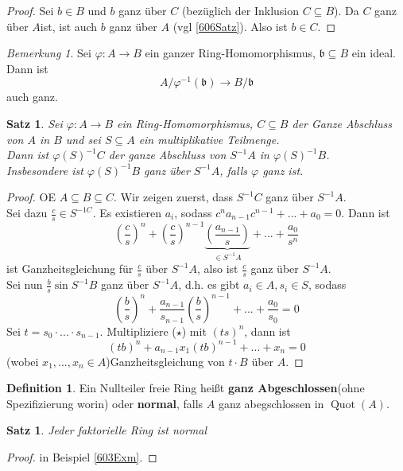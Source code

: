 \documentclass[10pt,a4paper]{article}
\newcommand{\Quot}{\operatorname{Quot}}
\newcounter{thm}[section]
\theoremstyle{definition}
\newtheorem{definition}[thm]{Definition}
\theoremstyle{plain}
\newtheorem{satz}[thm]{Satz}
\theoremstyle{remark}
\newtheorem{bem}[thm]{Bemerkung}
\begin{document}
\begin{proof}
	Sei $b\in B$ und $b$ ganz über $C$ (bezüglich der Inklusion $C\subseteq B$). Da $C$ ganz über $A$ist, ist auch $b$ ganz über $A$ (vgl \ref{606Satz}). Also ist $b\in C$.
\end{proof}

\begin{bem}
	Sei $\varphi:A\rightarrow B$ ein ganzer Ring-Homomorphismus, $\mathfrak b\subseteq B$ ein ideal. Dann ist\[A/\varphi^{-1}(\mathfrak b)\rightarrow B/\mathfrak b\]
	auch ganz.
\end{bem}

\begin{satz}\label{611Satz}
	Sei $\varphi:A\rightarrow B$ ein Ring-Homomorphismus, $C\subseteq B$ der Ganze Abschluss von $A$ in $B$ und sei $S\subseteq A$ ein multiplikative Teilmenge.\\
	Dann ist $\varphi(S)^{-1}C$ der ganze Abschluss von $S^{-1}A$ in $\varphi(S)^{-1}B$.\\
	Insbesondere ist $ \varphi(S)^{-1}B $ ganz über $S^{-1}A$, falls $\varphi$ ganz ist.
\end{satz}
\begin{proof}
	OE $A\subseteq B\subseteq C$. Wir zeigen zuerst, dass $S^{-1}C$ ganz über $S^{-1}A$.\\
	Sei dazu $\frac{c}{s}\in S^{-1 C}$. Es existieren $a_i$, sodass $c^na_{n-1}c^{n-1}+...+a_0=0$. Dann ist
	\[\left(\frac{c}{s}\right)^n+\left(\frac{c}{s}\right)^{n-1}\underbrace{\left(\frac{a_{n-1}}{s}\right)}_{\in S^{-1}A}+...+\frac{a_0}{s^n}\]
	ist Ganzheitsgleichung für $\frac{c}{s}$ über $S^{-1}A$, also ist $\frac{c}{s}$ ganz  über $S^{-1}A$.\\
	Sei nun $\frac{b}{s}\sin S^{-1}B$ ganz über $S^{-1}A$, d.h. es gibt $a_i\in A,s_i\in S$, sodass
	\[\tag{$\star$}\left(\frac{b}{s}\right)^n+\frac{a_{n-1}}{s_{n-1}}\left(\frac{b}{s}\right)^{n-1}+...+\frac{a_0}{s_0}=0\]
	Sei $t=s_0\cdot...\cdot s_{n-1}$. Multipliziere ($\star$) mit $(ts)^n$, dann ist
	\[(tb)^n+a_{n-1}x_1(tb)^{n-1}+...+x_n=0\]
	(wobei $x_1,...,x_n\in A$)Ganzheitsgleichung von $t\cdot B$ über $A$.
\end{proof}

\begin{definition}
	Ein Nullteiler freie Ring heißt \textbf{ganz Abgeschlossen}(ohne Spezifizierung worin) oder \textbf{normal}, falls $A$ ganz abegschlossen in $\Quot(A)$.
\end{definition}

\begin{satz}
	Jeder faktorielle Ring ist normal
\end{satz}
\begin{proof}
	in Beispiel \ref{603Exm}.
\end{proof}
\end{document}
